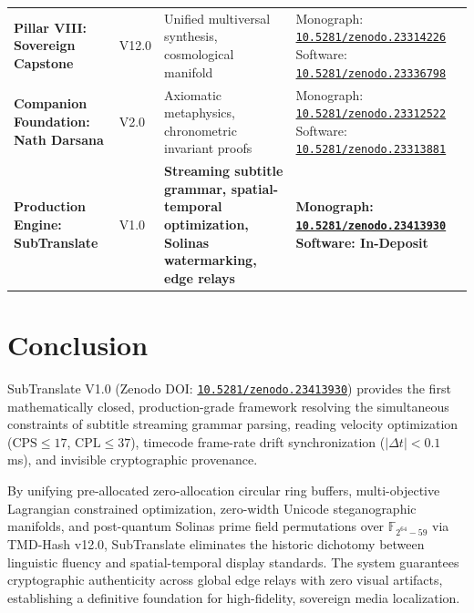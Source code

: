 \documentclass[11pt,a4paper,reqno]{article}
\newcommand{\zenodo}[1]{\href{https://doi.org/10.5281/zenodo.#1}{\nolinkurl{10.5281/zenodo.#1}}}
\theoremstyle{definition}
\theoremstyle{remark}
\begin{document}
\begin{longtable}{@{}>{\raggedright\arraybackslash}p{}p{}>{\raggedright\arraybackslash}p{}>{\raggedright\arraybackslash}p{}@{}}
\addlinespace
\textbf{Pillar VIII: Sovereign Capstone} & V12.0 & Unified multiversal synthesis, cosmological manifold & Monograph: \zenodo{23314226} \newline Software: \zenodo{23336798} \\
\addlinespace
\textbf{Companion Foundation: Nath Darsana} & V2.0 & Axiomatic metaphysics, chronometric invariant proofs & Monograph: \zenodo{23312522} \newline Software: \zenodo{23313881} \\
\addlinespace
\midrule
\textbf{Production Engine: SubTranslate} & V1.0 & \textbf{Streaming subtitle grammar, spatial-temporal optimization, Solinas watermarking, edge relays} & \textbf{Monograph: \zenodo{23413930}} \newline \textbf{Software: In-Deposit} \\
\bottomrule
\end{longtable}
\normalsize

\section{Conclusion}
\label{sec:conclusion}

SubTranslate V1.0 (Zenodo DOI: \zenodo{23413930}) provides the first mathematically closed, production-grade framework resolving the simultaneous constraints of subtitle streaming grammar parsing, reading velocity optimization ($\text{CPS} \le 17$, $\text{CPL} \le 37$), timecode frame-rate drift synchronization ($|\Delta t| < 0.1$\,ms), and invisible cryptographic provenance. 

By unifying pre-allocated zero-allocation circular ring buffers, multi-objective Lagrangian constrained optimization, zero-width Unicode steganographic manifolds, and post-quantum Solinas prime field permutations over $\mathbb{F}_{2^{64}-59}$ via TMD-Hash v12.0, SubTranslate eliminates the historic dichotomy between linguistic fluency and spatial-temporal display standards. The system guarantees cryptographic authenticity across global edge relays with zero visual artifacts, establishing a definitive foundation for high-fidelity, sovereign media localization.
\end{document}
